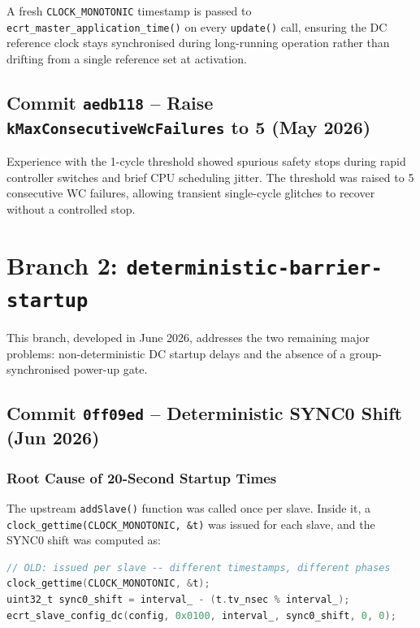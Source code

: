 \documentclass[11pt,a4paper]{article}
\begin{document}
A fresh \texttt{CLOCK\_MONOTONIC} timestamp is passed to
\texttt{ecrt\_master\_application\_time()} on every \texttt{update()} call,
ensuring the DC reference clock stays synchronised during long-running
operation rather than drifting from a single reference set at activation.

\subsection{Commit \texttt{aedb118} -- Raise \texttt{kMaxConsecutiveWcFailures} to 5 (May 2026)}

Experience with the 1-cycle threshold showed spurious safety stops during
rapid controller switches and brief CPU scheduling jitter.  The threshold was
raised to 5 consecutive WC failures, allowing transient single-cycle glitches
to recover without a controlled stop.

\section{Branch 2: \texttt{deterministic-barrier-startup}}
\label{sec:barrier-branch}

This branch, developed in June 2026, addresses the two remaining major
problems: non-deterministic DC startup delays and the absence of a
group-synchronised power-up gate.

\subsection{Commit \texttt{0ff09ed} -- Deterministic SYNC0 Shift (Jun 2026)}
\label{sec:sync0-fix}

\subsubsection{Root Cause of 20-Second Startup Times}

The upstream \texttt{addSlave()} function was called once per slave.  Inside
it, a \texttt{clock\_gettime(CLOCK\_MONOTONIC, \&t)} was issued for each
slave, and the SYNC0 shift was computed as:

\begin{lstlisting}[language=C,caption={Old (broken) per-slave SYNC0 shift}]
// OLD: issued per slave -- different timestamps, different phases
clock_gettime(CLOCK_MONOTONIC, &t);
uint32_t sync0_shift = interval_ - (t.tv_nsec % interval_);
ecrt_slave_config_dc(config, 0x0100, interval_, sync0_shift, 0, 0);
\end{lstlisting}
\end{document}
